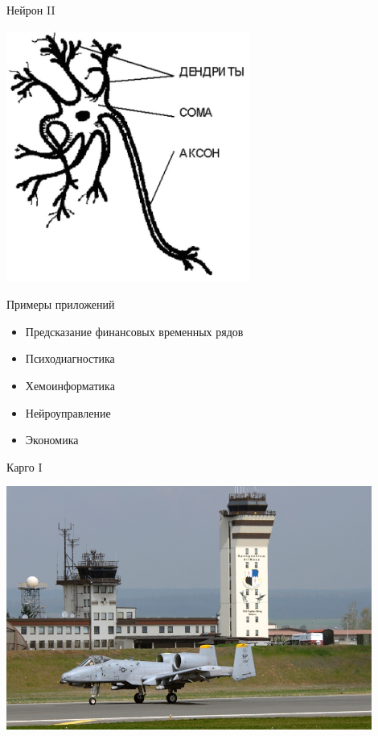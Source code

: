 \documentclass[14pt, fleqn, xcolor={dvipsnames, table}]{beamer}
\begin{document}
\begin{frame}{Нейрон II}
\begin{center}
\includegraphics[width=0.6\textwidth]{neuron_simple}
\end{center}
\end{frame}

\begin{frame}{Примеры приложений}
\begin{itemize}
  \item Предсказание финансовых временных рядов
  \item Психодиагностика
  \item Хемоинформатика
  \item Нейроуправление
  \item Экономика
\end{itemize}
\end{frame}

\begin{frame}{Карго I}
\begin{center}
\includegraphics[width=0.9\textwidth]{good_cargo}
\end{center}
\end{frame}
\end{document}
